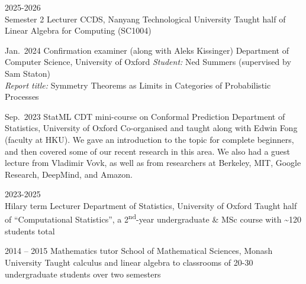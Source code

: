 \documentclass[9pt]{developercv} %
\begin{document}

\begin{entrylist}
    \entry
        {2025-2026 \\ \footnotesize{Semester 2}}
        {Lecturer}
        {CCDS, Nanyang Technological University}
        {Taught half of Linear Algebra for Computing (SC1004)}

    \entry
        {Jan.\ 2024}
        {Confirmation examiner (along with Aleks Kissinger)}
        {Department of Computer Science, University of Oxford}
        {\emph{Student:} Ned Summers (supervised by Sam Staton) \\
        \emph{Report title:} Symmetry Theorems as Limits in Categories of Probabilistic Processes}

    \entry
        {Sep.\ 2023}
        {StatML CDT mini-course on Conformal Prediction}
        {Department of Statistics, University of Oxford}
        {Co-organised and taught along with Edwin Fong (faculty at HKU). We gave an introduction to the topic for complete beginners, and then covered some of our recent research in this area. We also had a guest lecture from Vladimir Vovk, as well as from researchers at Berkeley, MIT, Google Research, DeepMind, and Amazon.}

    \entry
        {2023-2025\\\footnotesize{Hilary term}}
        {Lecturer}
        {Department of Statistics, University of Oxford}
        {Taught half of ``Computational Statistics'', a 2\textsuperscript{nd}-year undergraduate \& MSc course with \textasciitilde120 students total}

    \entry
        {2014 -- 2015}%
        {Mathematics tutor}
        {School of Mathematical Sciences, Monash University}
        {Taught calculus and linear algebra to classrooms of 20-30 undergraduate students over two semesters}
\end{entrylist}


\end{document}
